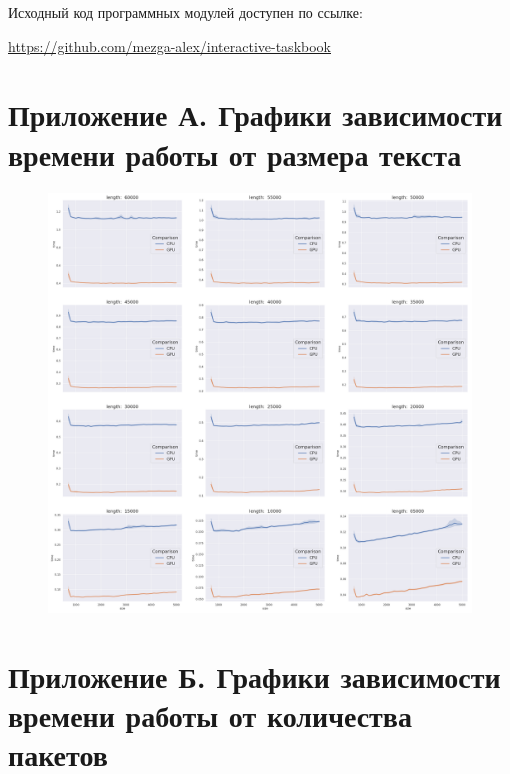 Исходный код программных модулей доступен по ссылке:

\href{https://github.com/mezga-alex/interactive-taskbook}{https://github.com/mezga-alex/interactive-taskbook }
\newpage

\printbibliography[%
    heading=bibintoc%
]

\newpage
\section*{Приложение А. Графики зависимости времени работы от размера текста}
\label{sec:len}

\begin{figure}[h]
\centering
\includegraphics[width=\textwidth]{img/len_CPU_vs_GPU_Grid}
\end{figure}

\newpage
\section*{Приложение Б. Графики зависимости времени работы от количества пакетов}
\label{sec:num}

